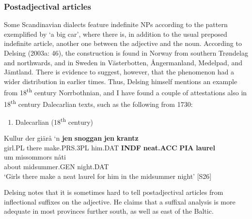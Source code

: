 \subsubsection[Postadjectival articles]{\rmfamily Postadjectival articles}
Some Scandinavian dialects feature indefinite NPs according to the pattern exemplified by ‘a big car’, where there is, in addition to the usual preposed indefinite article, another one between the adjective and the noun. According to Delsing (2003a: 46), the construction is found in Norway from southern Trøndelag and northwards, and in Sweden in Västerbotten, Ångermanland, Medelpad, and Jämtland. There is evidence to suggest, however, that the phenomenon had a wider distribution in earlier times. Thus, Delsing himself mentions an example from 18\textsuperscript{th} century Norrbothnian, and I have found a couple of attestations also in 18\textsuperscript{th} century Dalecarlian texts, such as the following from 1730: 

\begin{enumerate} %
\item 
Dalecarlian (18\textsuperscript{th} century)
\end{enumerate} %
\ea\label{}
\gll Kullur  der  giärå  ‘n  \textbf{jen} \textbf{snoggan} \textbf{jen} \textbf{krantz}\\


girl.PL  there  make.PRS.3PL  him.DAT  \textbf{INDF} \textbf{neat.ACC} \textbf{PIA} \textbf{laurel}\\ %


\ea\label{}
\gll um  missommors  nåti\\


about  midsummer.GEN  night.DAT\\ %


‘Girls there make a neat laurel for him in the midsummer night’ [S26]
\z

Delsing notes that it is sometimes hard to tell postadjectival articles from inflectional suffixes on the adjective. He claims that a suffixal analysis is more adequate in most provinces further south, as well as east of the Baltic. 

